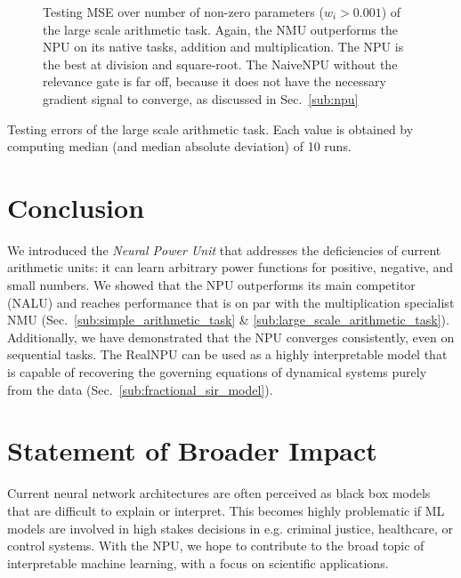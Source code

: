 \documentclass[9pt]{article}
\begin{document}
\begin{figure}
  \centering
  \resizebox{\textwidth}{!}{}
  \caption{Testing MSE over number of non-zero parameters ($w_i > 0.001$) of the large scale
  arithmetic task.  Again, the NMU outperforms the NPU on its
  native tasks, addition and multiplication. The NPU is the best at division
  and square-root.  The NaiveNPU without the relevance gate is far off, because
  it does not have the necessary gradient signal to converge, as discussed in
  Sec.~\ref{sub:npu}}%
  \label{fig:pareto}
\end{figure}

\begin{table}
  \centering
  \caption{Testing errors of the large scale arithmetic task. Each value is
  obtained by computing median (and median absolute deviation) of 10 runs.}
  \label{tab:arithmetic100_val}
  \small
  
\end{table}

 
\section{Conclusion}%
\label{sec:conclusion}

We introduced the \emph{Neural Power Unit} that addresses the deficiencies
of current arithmetic units: it can learn arbitrary power functions for
positive, negative, and small numbers. We showed that the NPU outperforms its
main competitor (NALU) and reaches performance that is on par with the
multiplication specialist NMU (Sec.~\ref{sub:simple_arithmetic_task} \&
\ref{sub:large_scale_arithmetic_task}).\\
Additionally, we have demonstrated that the NPU converges consistently, even on
sequential tasks. The RealNPU can be used as a highly interpretable model that
is capable of recovering the governing equations of dynamical systems purely
from the data (Sec.~\ref{sub:fractional_sir_model}).

\section{Statement of Broader Impact}%
\label{sec:statement_of_broader_impact}

Current neural network architectures are often perceived as black box models
that are difficult to explain or interpret. This becomes highly problematic if
ML models are involved in high stakes decisions in e.g. criminal justice,
healthcare, or control systems.  With the NPU, we hope to contribute to the
broad topic of interpretable machine learning, with a focus on scientific
applications.
\end{document}
